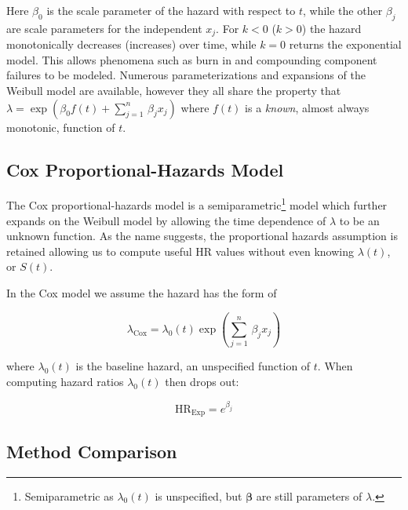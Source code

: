 \noindent Here $\beta_{0}$ is the scale parameter of the hazard with respect to $t$,
while the other $\beta_{j}$ are scale parameters for the independent $x_{j}$.
For $k<0$ ($k>0$) the hazard monotonically decreases (increases) over time,
while $k=0$ returns the exponential model.
This allows phenomena such as burn in and compounding component failures to be modeled.
Numerous parameterizations and expansions of the Weibull model are available,
however they all share the property that
$\lambda = \exp\left(\beta_{0} f\left(t\right) + \sum_{j=1}^{n}\, \beta_{j} x_{j}\right)$
where $f\left(t\right)$ is a {\em known}, almost always monotonic, function of $t$.

\subsection{Cox Proportional-Hazards Model}
\label{additional:Survival:cox}
The Cox proportional-hazards model \cite{cox} is a
semiparametric\footnote{Semiparametric as $\lambda_{0}\left(t\right)$ is unspecified, but $\bm{\beta}$ are still parameters of $\lambda$.} model
which further expands on the Weibull model by allowing
the time dependence of $\lambda$ to be an unknown function.
As the name suggests, the proportional hazards assumption is retained
allowing us to compute useful HR values
without even knowing $\lambda\left(t\right)$, or $S\left(t\right)$.

In the Cox model we assume the hazard has the form of

\begin{equation}\label{eq:Survival:cox_lambda}
\lambda_{\text{Cox}} = \lambda_{0}\left(t\right) \exp\left(\sum_{j=1}^{n}\, \beta_{j} x_{j}\right)
\end{equation}

\noindent where $\lambda_{0}\left(t\right)$ is the baseline hazard, an unspecified function of $t$.
When computing hazard ratios $\lambda_{0}\left(t\right)$ then drops out:

\begin{equation}\label{eq:Survival:cox_HR}
\text{HR}_{\text{Exp}} = e^{\beta_{j}}
\end{equation}

\subsection{Method Comparison}
\label{additional:Survival:comp}

